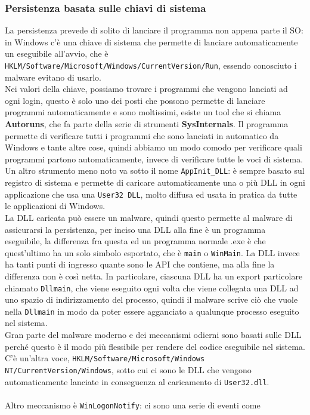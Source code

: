 \documentclass[12pt, oneside]{extbook}
\begin{document}
\subsubsection{Persistenza basata sulle chiavi di sistema}
La persistenza prevede di solito di lanciare il programma non appena parte il SO: in Windows c'è una chiave di sistema che permette di lanciare automaticamente un eseguibile all'avvio, che è \texttt{HKLM/Software/Microsoft/Windows/CurrentVersion/Run}, essendo conosciuto i malware evitano di usarlo.\\Nei valori della chiave, possiamo trovare i programmi che vengono lanciati ad ogni login, questo è solo uno dei posti che possono permette di lanciare programmi automaticamente e sono moltissimi, esiste un tool che si chiama \textbf{Autoruns}, che fa parte della serie di strumenti \textbf{SysInternals}. Il programma permette di verificare tutti i programmi che sono lanciati in automatico da Windows e tante altre cose, quindi abbiamo un modo comodo per verificare quali programmi partono automaticamente, invece di verificare tutte le voci di sistema.\\Un altro strumento meno noto va sotto il nome \texttt{AppInit\_DLL}: è sempre basato sul registro di sistema e permette di caricare automaticamente una o più DLL in ogni applicazione che usa una \texttt{User32 DLL}, molto diffusa ed usata in pratica da tutte le applicazioni di Windows.\\La DLL caricata può essere un malware, quindi questo permette al malware di assicurarsi la persistenza, per inciso una DLL alla fine è un programma eseguibile, la differenza fra questa ed un programma normale .exe è che quest'ultimo ha un solo simbolo esportato, che è \texttt{main} o \texttt{WinMain}. La DLL invece ha tanti punti di ingresso quante sono le API che contiene, ma alla fine la differenza non è così netta. In particolare, ciascuna DLL ha un export particolare chiamato \texttt{Dllmain}, che viene eseguito ogni volta che viene collegata una DLL ad uno spazio di indirizzamento del processo, quindi il malware scrive ciò che vuole nella \texttt{Dllmain} in modo da poter essere agganciato a qualunque processo eseguito nel sistema.\\Gran parte del malware moderno e dei meccanismi odierni sono basati sulle DLL perché questo è il modo più flessibile per rendere del codice eseguibile nel sistema. C'è un'altra voce, \texttt{HKLM/Software/Microsoft/Windows NT/CurrentVersion/Windows}, sotto cui ci sono le DLL che vengono automaticamente lanciate in conseguenza al caricamento di \texttt{User32.dll}.\\\\Altro meccanismo è \texttt{WinLogonNotify}: ci sono una serie di eventi come
\end{document}
